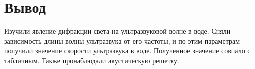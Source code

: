 \documentclass[a4paper, 12pt]{article}%
\begin{document}
\newpage
\section*{Вывод}

Изучили явление дифракции света на ультразвуковой волне в воде. Сняли зависимость длины волны ультразвука от его частоты, и по этим параметрам получили значение скорости ультразвука в воде. Полученное значение совпало с табличным. Также пронаблюдали акустическую решетку.
\end{document}
